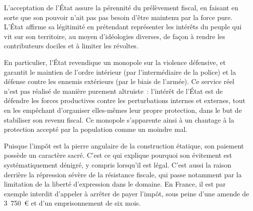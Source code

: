 L'acceptation de l'État assure la pérennité du prélèvement fiscal, en faisant en sorte que son pouvoir n'ait pas pas besoin d'être maintenu par la force pure. L'État affirme sa légitimité en prétendant représenter les intérêts du peuple qui vit sur son territoire, au moyen d'idéologies diverses, de façon à rendre les contributeurs dociles et à limiter les révoltes.

En particulier, l'État revendique un monopole sur la violence défensive, et garantit le maintien de l'ordre intérieur (par l'intermédiaire de la police) et la défense contre les ennemis extérieurs (par le biais de l'armée). Ce service réel n'est pas réalisé de manière purement altruiste~: l'intérêt de l'État est de défendre les forces productives contre les perturbations internes et externes, tout en les empêchant d'organiser elles-mêmes leur propre protection, dans le but de stabiliser son revenu fiscal. Ce monopole s'apparente ainsi à un chantage à la protection accepté par la population comme un moindre mal.

Puisque l'impôt est la pierre angulaire de la construction étatique, son paiement possède un caractère sacré. C'est ce qui explique pourquoi son évitement est systématiquement dénigré, y compris lorsqu'il est légal. C'est aussi la raison derrière la répression sévère de la résistance fiscale, qui passe notamment par la limitation de la liberté d'expression dans le domaine. En France, il est par exemple interdit d'appeler à arrêter de payer l'impôt, sous peine d'une amende de 3~750~\euro{} et d'un emprisonnement de six mois. %

